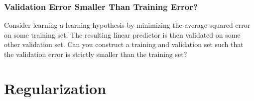 \documentclass[12pt]{report}
\begin{document}
\subsection{Validation Error Smaller Than Training Error?} 
Consider learning a learning hypothesis by minimizing the average 
squared error on some training set. The resulting linear predictor 
is then validated on some other validation set. Can you construct 
a training and validation set such that the validation error is strictly 
smaller than the training set?



\newpage 
\chapter{Regularization}
\label{ch_overfitting_regularization}
\vspace*{-10mm}
\end{document}
